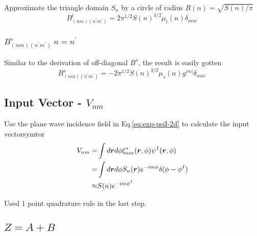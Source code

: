 \documentclass [10pt,letterpaper]{article}
\begin{document}
Approximate the triangle domain $S_n$ by a circle of radius $R(n)=\sqrt{S(n)/\pi}$
\begin{equation} \label{eq:result-Btnmnpmp-diagonal-1pt}
	B^t_{(n m)(n^\prime m^\prime)}
	=
	2 
	\pi^{1/2}
	S(n)^{3/2}
	\mu_t(n) 
	\delta_{m m^\prime}
\end{equation}

\subsubsection{$B^s_{(n m)(n^\prime m^\prime)} \ n=n^\prime$}
\label{subsub:Bsnmnpmp-diagonal}

Similar to the derivation of off-diagonal $B^s$, the result is easily gotten
\begin{equation} \label{eq:retsult-Bsnmnpmp-diagonal-1p}
	B^s_{(n m)(n^\prime m^\prime)}
	=
	-2 
	\pi^{1/2}
	S(n)^{3/2}
	\mu_s(n)g^{\lvert m\rvert} 
	\delta_{m m^\prime}
\end{equation}

\subsection{Input Vector - $V_{n m}$}
\label{input-vectorsymtor-Vnm}

Use the plane wave incidence field in Eq.\eqref{eq:exp-psiI-2d} to calculate the input vectorsymtor
\begin{equation} \label{eq:result-Vnm-1pt}
	\begin{split}
		V_{n m}
		=&
		\int d\vectorsym{r} d\phi
		\xi^*_{n m} (\vectorsym{r},\phi)
		\psi^I (\vectorsym{r},\phi)
		\\
		=&
		\int d\vectorsym{r} d\phi
		S_n(\vectorsym{r})
		e^{-i m \phi}
		\delta(\phi-\phi^I)
		\\
		\approx&
		S(n)e^{-i m \phi^I}
	\end{split}
\end{equation}

Used 1 point quadrature rule in the last step.
\subsection{$Z=A+B$}
\label{sub:Z-A-B}
\end{document}
